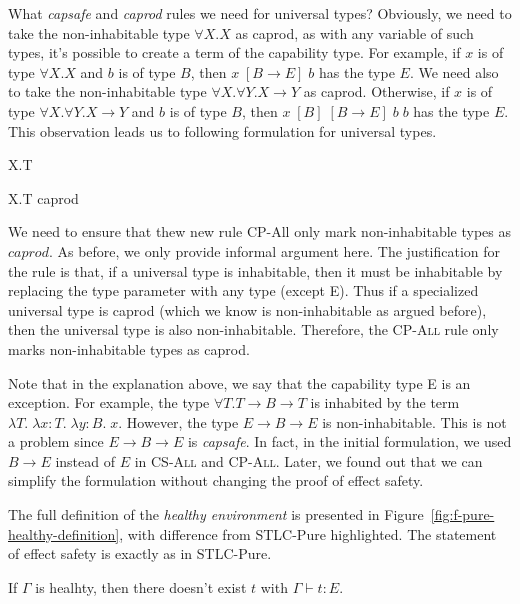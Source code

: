 What \emph{capsafe} and \emph{caprod} rules we need for universal
types? Obviously, we need to take the non-inhabitable type
$\forall X.X$ as caprod, as with any variable of such types, it's
possible to create a term of the capability type. For example, if $x$
is of type $\forall X.X$ and $b$ is of type $B$, then
$x \; [B \to E] \; b$ has the type $E$.  We need also to take the
non-inhabitable type $\forall X. \forall Y. X \to Y$ as
caprod. Otherwise, if $x$ is of type $\forall X. \forall Y. X \to Y$
and $b$ is of type $B$, then $x \; [B] \; [B \to E] \; b \; b$ has the
type $E$. This observation leads us to following formulation for
universal types.

{ \forall X.T \quad {} }

{ \forall X.T \quad caprod }

We need to ensure that thew new rule CP-All only mark non-inhabitable
types as $caprod$. As before, we only provide informal argument
here. The justification for the rule  is that, if a
universal type is inhabitable, then it must be inhabitable by
replacing the type parameter with any type (except E). Thus if a
specialized universal type is caprod (which we know is non-inhabitable
as argued before), then the universal type is also
non-inhabitable. Therefore, the \textsc{CP-All} rule only marks
non-inhabitable types as caprod.

Note that in the explanation above, we say that the capability type E
is an exception. For example, the type $\forall T.T \to B \to T$ is
inhabited by the term
$\lambda T. \; \lambda x:T. \; \lambda y:B. \; x$. However, the type
$E \to B \to E$ is non-inhabitable. This is not a problem since
$E \to B \to E$ is \emph{capsafe}. In fact, in the initial
formulation, we used $B \to E$ instead of $E$ in \textsc{CS-All} and
\textsc{CP-All}. Later, we found out that we can simplify the
formulation without changing the proof of effect safety.

The full definition of the \emph{healthy environment} is presented in
Figure~\ref{fig:f-pure-healthy-definition}, with difference from
STLC-Pure highlighted. The statement of effect safety is exactly as in
STLC-Pure.

\begin{definition}
  If $\Gamma$ is healhty, then there doesn't exist $t$ with
  $\Gamma \vdash t : E$.
\end{definition}

